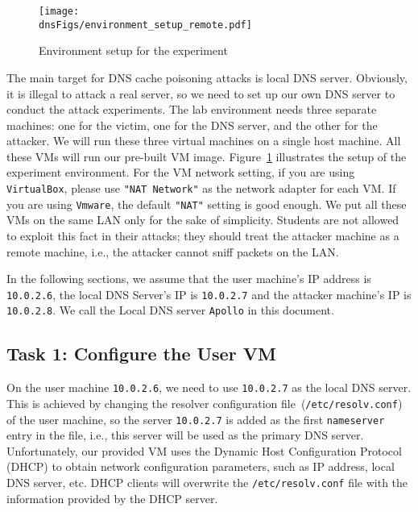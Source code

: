 \begin{figure}[htb]
\centering
\texttt{[image: \\dnsFigs/environment\_setup\_remote.pdf]}
\caption{Environment setup for the experiment}
\label{dns:fig:environment}
\end{figure}



The main target for DNS cache poisoning attacks is
local DNS server.  Obviously, it
is illegal to attack a real server, so we need to set up our own DNS
server to  conduct the attack experiments. The lab
environment needs three separate machines:
one for the victim, one for the DNS server, and the other for the attacker.
We will run these three virtual machines on a single host machine.
All these VMs will run our pre-built \ubuntu VM image.
Figure~\ref{dns:fig:environment} illustrates the setup of the experiment environment. 
For the VM network setting, if you
are using {\tt VirtualBox}, please use {\tt "NAT Network"} as the 
network adapter for each VM.  If you are using {\tt Vmware}, the default
{\tt "NAT"} setting is good enough.
We put all these VMs on the same LAN only for the sake of simplicity. 
Students are not allowed to exploit this fact in their attacks; 
they should treat the attacker machine as a remote machine, 
i.e., the attacker cannot sniff packets on the LAN.


In the following sections, we assume that the user machine's IP address is
{\tt 10.0.2.6}, the local DNS Server's IP is {\tt 10.0.2.7} and the attacker
machine's IP is {\tt 10.0.2.8}. We call the Local DNS server
\texttt{Apollo} in this document. 


\subsection{Task 1: Configure the User VM} 
\label{subsec:user_machine}


On the user machine {\tt 10.0.2.6}, we need to use
{\tt 10.0.2.7} as the local DNS server.
This is achieved by changing
the resolver configuration file~(\texttt{/etc/resolv.conf}) of the user machine,
so the server \texttt{10.0.2.7} is added as the first \texttt{nameserver} entry in the file, i.e.,
this server will be used as the primary DNS server.
Unfortunately, our provided VM uses the Dynamic Host Configuration Protocol (DHCP) to obtain
network configuration parameters, such as IP address, local DNS server, etc.
DHCP clients will overwrite the \texttt{/etc/resolv.conf} file with the information
provided by the DHCP server.


